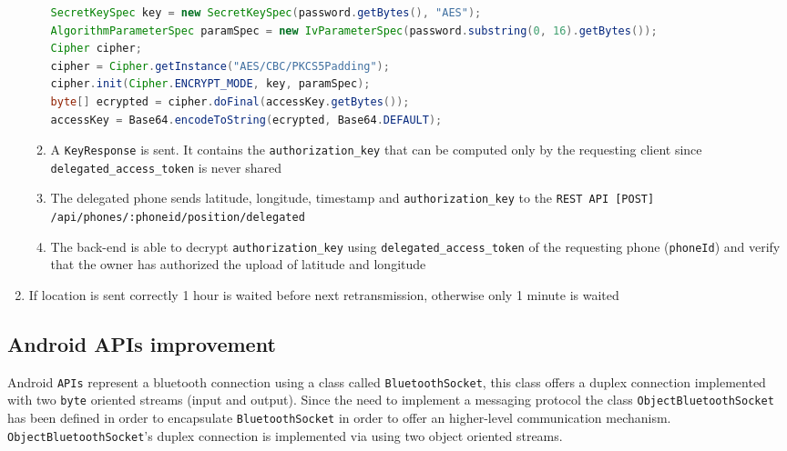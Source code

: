 \documentclass[conference, 11pt]{IEEEtran}
\begin{document}
\begin{enumerate}
\begin{enumerate}
\begin{lstlisting}[float, language=Java, caption=AES password encryption, label=encrypt]
SecretKeySpec key = new SecretKeySpec(password.getBytes(), "AES");
AlgorithmParameterSpec paramSpec = new IvParameterSpec(password.substring(0, 16).getBytes());
Cipher cipher;
cipher = Cipher.getInstance("AES/CBC/PKCS5Padding");	    
cipher.init(Cipher.ENCRYPT_MODE, key, paramSpec);			    	
byte[] ecrypted = cipher.doFinal(accessKey.getBytes());
accessKey = Base64.encodeToString(ecrypted, Base64.DEFAULT);
\end{lstlisting}	
			\item A \texttt{KeyResponse} is sent. It contains the \texttt{authorization\_key} that can be computed only by the requesting client since \texttt{delegated\_access\_token} is never shared
			\item The delegated phone sends latitude, longitude, timestamp and \texttt{authorization\_key} to the \texttt{REST API [POST] /api\allowbreak/phones\allowbreak/:phoneid\allowbreak/position/delegated}
			\item The back-end is able to decrypt \texttt{authorization\_key} using \texttt{delegated\_access\_token} of the requesting phone (\texttt{phoneId}) and verify that the owner has authorized the upload of latitude and longitude
		\end{enumerate}
	\item If location is sent correctly 1 hour is waited before next retransmission, otherwise only 1 minute is waited
\end{enumerate}

\subsection{\textbf{Android APIs improvement}}
Android \texttt{APIs} represent a bluetooth connection using a class called \texttt{BluetoothSocket}, this class offers a duplex connection implemented with two \texttt{byte} oriented streams (input and output). Since the need to implement a messaging protocol the class \texttt{ObjectBluetoothSocket} has been defined in order to encapsulate \texttt{BluetoothSocket} in order to offer an higher-level communication mechanism. \texttt{ObjectBluetoothSocket}'s duplex connection is implemented via using two object oriented streams.
\end{document}
